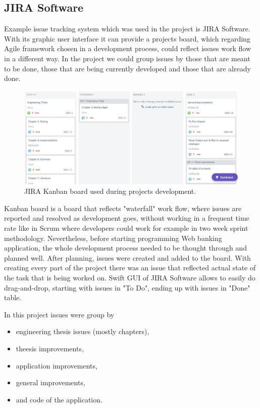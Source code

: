 \documentclass[a4paper,12pt]{book}
\newcommand\tab[1][1cm]{\hspace*{#1}}
\begin{document}
\subsection{JIRA Software}
{
\tab Example issue tracking system which was used in the project is JIRA Software. With its graphic user interface it can provide a projects board, which regarding Agile framework chosen in a development process, could reflect issues work flow in a different way. In the project we could group issues by those that are meant to be done, those that are being currently developed and those that are already done.

\bigskip
\begin{figure}[h]
  \centering
    \includegraphics[width=1.0\textwidth]{kanban}
    \caption{JIRA Kanban board used during projects development.~\cite{jiraboard}}
\end{figure} 
    
\bigskip Kanban board is a board that reflects "waterfall" work flow, where issues are reported and resolved as development goes, without working in a frequent time rate like in Scrum where developers could work for example in two week sprint methodology. Nevertheless, before starting programming Web banking application, the whole development process needed to be thought through and planned well. After planning, issues were created and added to the board. With creating every part of the project there was an issue that reflected actual state of the task that is being worked on. Swift GUI of JIRA Software allows to easily do drag-and-drop, starting with issues in "To Do", ending up with issues in "Done" table.
    
\bigskip
In this project issues were group by
\begin{itemize}
	\item engineering thesis issues (mostly chapters),
	\item theesis improvements,
	\item application improvements,
	\item general improvements,
	\item and code of the application.
\end{itemize}
	
}
\end{document}
